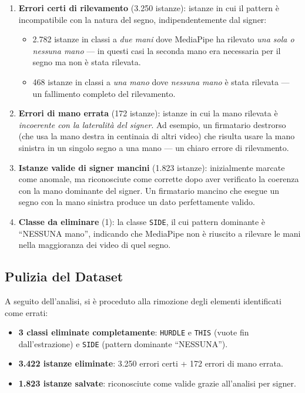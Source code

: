 \begin{enumerate}
    \item \textbf{Errori certi di rilevamento} (3.250 istanze): istanze in cui il pattern è incompatibile con la natura del segno, indipendentemente dal signer:
    \begin{itemize}
        \item 2.782 istanze in classi a \textit{due mani} dove MediaPipe ha rilevato \textit{una sola o nessuna mano} --- in questi casi la seconda mano era necessaria per il segno ma non è stata rilevata.
        \item 468 istanze in classi a \textit{una mano} dove \textit{nessuna mano} è stata rilevata --- un fallimento completo del rilevamento.
    \end{itemize}

    \item \textbf{Errori di mano errata} (172 istanze): istanze in cui la mano rilevata è \textit{incoerente con la lateralità del signer}. Ad esempio, un firmatario destrorso (che usa la mano destra in centinaia di altri video) che risulta usare la mano sinistra in un singolo segno a una mano --- un chiaro errore di rilevamento.

    \item \textbf{Istanze valide di signer mancini} (1.823 istanze): inizialmente marcate come anomale, ma riconosciute come corrette dopo aver verificato la coerenza con la mano dominante del signer. Un firmatario mancino che esegue un segno con la mano sinistra produce un dato perfettamente valido.

    \item \textbf{Classe da eliminare} (1): la classe \texttt{SIDE}, il cui pattern dominante è ``NESSUNA mano'', indicando che MediaPipe non è riuscito a rilevare le mani nella maggioranza dei video di quel segno.
\end{enumerate}

\subsection{Pulizia del Dataset}

A seguito dell'analisi, si è proceduto alla rimozione degli elementi identificati come errati:

\begin{itemize}
    \item \textbf{3 classi eliminate completamente}: \texttt{HURDLE} e \texttt{THIS} (vuote fin dall'estrazione) e \texttt{SIDE} (pattern dominante ``NESSUNA'').
    \item \textbf{3.422 istanze eliminate}: 3.250 errori certi + 172 errori di mano errata.
    \item \textbf{1.823 istanze salvate}: riconosciute come valide grazie all'analisi per signer.
\end{itemize}

